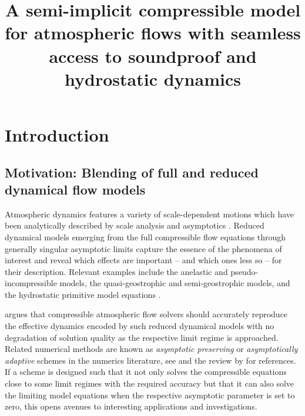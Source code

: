 \documentclass{ametsoc}
\title{A semi-implicit compressible model for atmospheric flows with seamless access to soundproof and hydrostatic dynamics}
\affiliation{MOX - Modelling and Scientific Computing,
Dipartimento di Matematica, Politecnico di Milano, Piazza Leonardo da Vinci 32, 20133 Milano, Italy}
\theoremstyle{definition}
\begin{document}
\maketitle


%
\section{Introduction}
\label{sec:Intro}


\subsection{Motivation: Blending of full and reduced dynamical flow models}

Atmospheric dynamics features a variety of scale-dependent motions which have been analytically described by scale analysis and asymptotics \citep[][]{Pedlosky1992,Klein2010}. Reduced dynamical models emerging from the full compressible flow equations through generally singular asymptotic limits capture the essence of the phenomena of interest and reveal which effects are important -- and which ones less so -- for their description. Relevant examples include the anelastic and pseudo-incompressible models, the quasi-geostrophic and semi-geostrophic models, and the hydrostatic primitive model equations \citep{HoskinsBretherton1972,LippsHemler1982,Durran1989,Pedlosky1992,Bannon1996,CullenMaroofi2003,Klein2010}. 

\citet{Cullen2007} argues that compressible atmospheric flow solvers should accurately reproduce the effective dynamics encoded by such reduced dynamical models with no degradation of solution quality as the respective limit regime is approached. Related numerical methods are known as \textit{asymptotic preserving} or \textit{asymptotically adaptive} schemes in the numerics literature, see \citet{KleinEtal2001} and the review by \citet{Jin2012} for references. If a scheme is designed such that it not only solves the compressible equations close to some limit regimes with the required accuracy but that it can also solve the limiting model equations when the respective asymptotic parameter is set to zero, this opens avenues to interesting applications and investigations.
\end{document}
